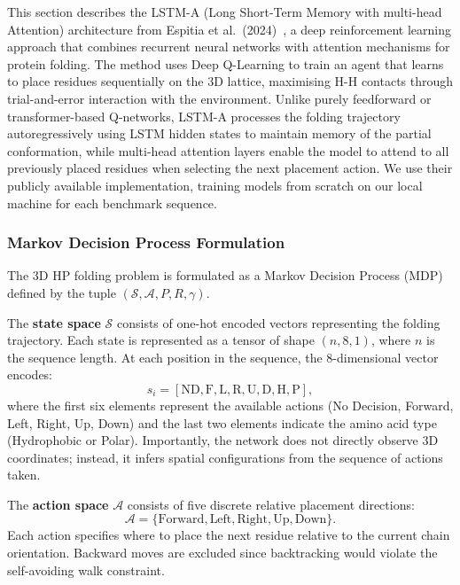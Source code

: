 \documentclass{article}
\theoremstyle{plain}
\theoremstyle{definition}
\begin{document}
This section describes the LSTM-A (Long Short-Term Memory with multi-head Attention) architecture from Espitia et al.~(2024)~\cite{Espitia2024}, a deep reinforcement learning approach that combines recurrent neural networks with attention mechanisms for protein folding. The method uses Deep Q-Learning to train an agent that learns to place residues sequentially on the 3D lattice, maximising H-H contacts through trial-and-error interaction with the environment. Unlike purely feedforward or transformer-based Q-networks, LSTM-A processes the folding trajectory autoregressively using LSTM hidden states to maintain memory of the partial conformation, while multi-head attention layers enable the model to attend to all previously placed residues when selecting the next placement action. We use their publicly available implementation, training models from scratch on our local machine for each benchmark sequence.

\subsubsection{Markov Decision Process Formulation}

The 3D HP folding problem is formulated as a Markov Decision Process (MDP) defined by the tuple $(\mathcal{S}, \mathcal{A}, P, R, \gamma)$.

The \textbf{state space} $\mathcal{S}$ consists of one-hot encoded vectors representing the folding trajectory. Each state is represented as a tensor of shape $(n, 8, 1)$, where $n$ is the sequence length. At each position in the sequence, the 8-dimensional vector encodes:
\begin{equation}
s_i = [\text{ND}, \text{F}, \text{L}, \text{R}, \text{U}, \text{D}, \text{H}, \text{P}],
\end{equation}
where the first six elements represent the available actions (No Decision, Forward, Left, Right, Up, Down) and the last two elements indicate the amino acid type (Hydrophobic or Polar). Importantly, the network does not directly observe 3D coordinates; instead, it infers spatial configurations from the sequence of actions taken.

The \textbf{action space} $\mathcal{A}$ consists of five discrete relative placement directions:
\begin{equation}
\mathcal{A} = \{\text{Forward}, \text{Left}, \text{Right}, \text{Up}, \text{Down}\}.
\end{equation}
Each action specifies where to place the next residue relative to the current chain orientation. Backward moves are excluded since backtracking would violate the self-avoiding walk constraint.
\end{document}
